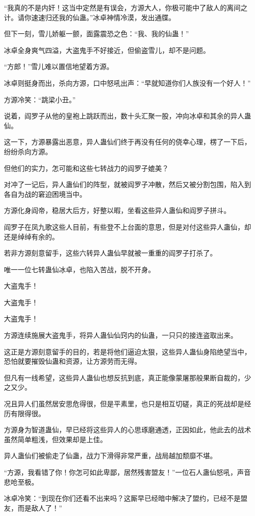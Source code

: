 \begin{this_body}
“我真的不是内奸！这当中定然是有误会，方源大人，你极可能中了敌人的离间之计。请你速速归还我的仙蛊。”冰卓神情冷漠，发出通牒。

但下一刻，雪儿娇躯一颤，面露震恐之色：“我、我的仙蛊！”

冰卓全身爽气四溢，大盗鬼手不好接近，但偷盗雪儿，却不是问题。

“方郎！”雪儿难以置信地望着方源。

冰卓则挺身而出，杀向方源，口中怒吼出声：“早就知道你们人族没有一个好人！”

方源冷笑：“跳梁小丑。”

说着，阎罗子从他的皇袍上跳跃而出，数十头汇聚一股，冲向冰卓和其余的异人蛊仙。

这一下，方源暴露出恶意，异人蛊仙们终于再没有任何的侥幸心理，楞了一下后，纷纷杀向方源。

但他们的实力，怎可能和这些七转战力的阎罗子媲美？

对冲了一记后，异人蛊仙们的阵型，就被阎罗子冲散，然后又被分割包围，陷入到各自为战的窘迫困境当中。

方源化身阎帝，稳居大后方，好整以暇，坐看这些异人蛊仙和阎罗子拼斗。

阎罗子在凤九歌这些人目前，有些登不上台面的意思，但是对付这些异人蛊仙，却还是绰绰有余的。

若非方源刻意留手，这些六转异人蛊仙早就被一重重的阎罗子打杀了。

唯一一位七转蛊仙冰卓，也陷入苦战，脱不开身。

大盗鬼手！

大盗鬼手！

大盗鬼手！

方源连续施展大盗鬼手，将异人蛊仙仙窍内的仙蛊，一只只的接连盗取出来。

这正是方源刻意留手的目的，若是将他们逼迫太狠，这些异人蛊仙身陷绝望当中，恐怕就要摧毁仙蛊和资源，让方源劳而无得。

但凡有一线希望，这些异人蛊仙也想反抗到底，真正能像蒙屠那般果断自裁的，少之又少。

况且异人们虽然居安思危得很，但是平素里，也只是相互切磋，真正的死战却是经历有限得很。

方源身为智道蛊仙，早已经将这些异人的心思琢磨通透，正因如此，他此去的战术虽然简单粗浅，但效果却是上佳。

异人蛊仙们被偷走了仙蛊，战力下滑得非常严重，战局越加颓靡不堪。

“方源，我看错了你！你怎可如此卑鄙，居然残害盟友！”一位石人蛊仙怒吼，声音悲呛至极。

冰卓冷笑：“到现在你们还看不出来吗？这厮早已经暗中解决了盟约，已经不是盟友，而是敌人了！”


\end{this_body}
